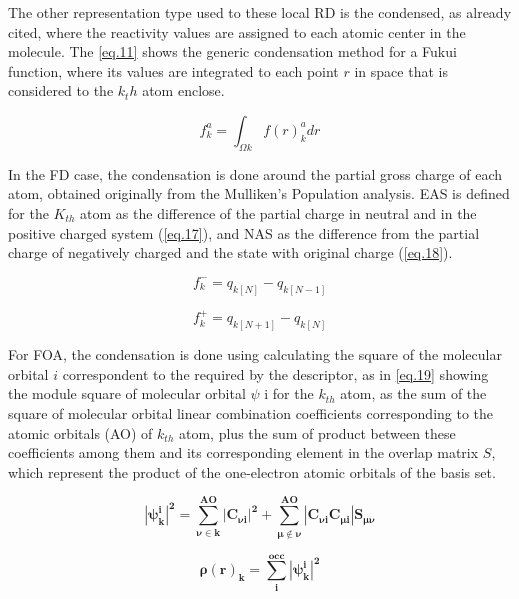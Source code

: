 \documentclass[a4paper,11pt]{refart}
\begin{document}
The other representation type used to these local RD is the condensed, as already cited, where the reactivity values are assigned to each atomic center in the molecule. The \autoref{eq.11} shows the generic condensation method for a Fukui function, where its values are integrated to each point $r$ in space that is considered to the $k_th$ atom enclose.  

\begin{equation}
f_k^{a} = \int_{\Omega k} f(r)^{a}_{k}dr
\label{eq.16}
\end{equation}

In the FD case, the condensation is done around the partial gross charge of each atom, obtained originally from the Mulliken's Population analysis. EAS is defined for the $K_{th}$ atom as the difference of the partial charge in neutral and in the positive charged system (\autoref{eq.17}), and NAS as the difference from the partial charge of negatively charged and the state with original charge (\autoref{eq.18}).

\begin{equation}
f^{-}_k = q_{k [N]} - q_{k [N-1]}
\label{eq.17}
\end{equation}

\begin{equation}
f^{+}_k = q_{k [N+1]} - q_{k [N]}
\label{eq.18}
\end{equation}

For FOA, the condensation is done using calculating the square of the molecular orbital $i$ correspondent to the required by the descriptor, as in \autoref{eq.19} showing the module square of  molecular orbital $\psi$ i for the $k_{th}$ atom, as the sum of the square of molecular orbital linear combination coefficients corresponding to the atomic orbitals (AO) of $k_{th}$ atom, plus the sum of product between these coefficients among them and its corresponding element in the overlap matrix $S$, which represent the product of the one-electron atomic orbitals of the basis set.
 
\begin{equation}
\mathbf{|\psi^i_k|^2  =\sum_{\nu \in k}^{AO} |C_{\nu i}|^{2} + \sum_{\mu \notin \nu }^{AO} |C_{\nu i} C_{\mu i}|S_{\mu \nu} }
\label{eq.19}
\end{equation}

\begin{equation}
\mathbf{ \rho(r)_k = \sum_{i}^{occ}|\psi^i_k|^2   }
\label{eq.1o9}
\end{equation}
\end{document}
